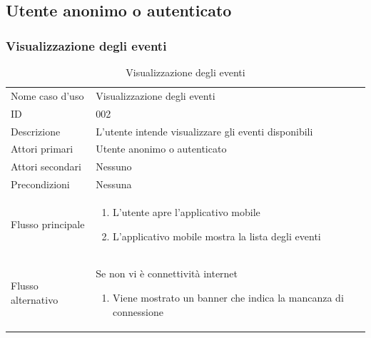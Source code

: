 \documentclass{article}
\begin{document}
\clearpage

\subsection{Utente anonimo o autenticato}

\subsubsection{Visualizzazione degli eventi}

\begin{table}[htbp]
    \label{8.2.1}
    \centering
    \begin{tabularx}{\textwidth}{| l | p{} |}
        \Xhline{2pt} %
        Nome caso d'uso & Visualizzazione degli eventi \\
        \Xhline{2pt} %
        ID & 002 \\
        \hline
        Descrizione & L'utente intende visualizzare gli eventi disponibili\\
        \hline
        Attori primari & Utente anonimo o autenticato\\
        \hline
        Attori secondari &  Nessuno \\
        \hline
        Precondizioni & Nessuna \\
        \hline
        Flusso principale & 
        \begin{enumerate}[topsep=5pt,partopsep=0pt,parsep=0pt,itemsep=0pt,before=\vspace{-\baselineskip},after=\vspace{-\baselineskip}]                
            \item L'utente apre l'applicativo mobile
            \item L'applicativo mobile mostra la lista degli eventi
        \end{enumerate}
        \\
        \hline
        Flusso alternativo & 
        Se non vi è connettività internet
        \begin{enumerate}[topsep=10pt,partopsep=0pt,parsep=0pt,itemsep=0pt,before=\vspace{-\baselineskip},after=\vspace{-\baselineskip}]                
            \item Viene mostrato un banner che indica la mancanza di connessione
        \end{enumerate}
        \\
        \hline
    \end{tabularx}
    \caption{Visualizzazione degli eventi}
    \label{tab:tabella_use_case002}
\end{table}
\end{document}
